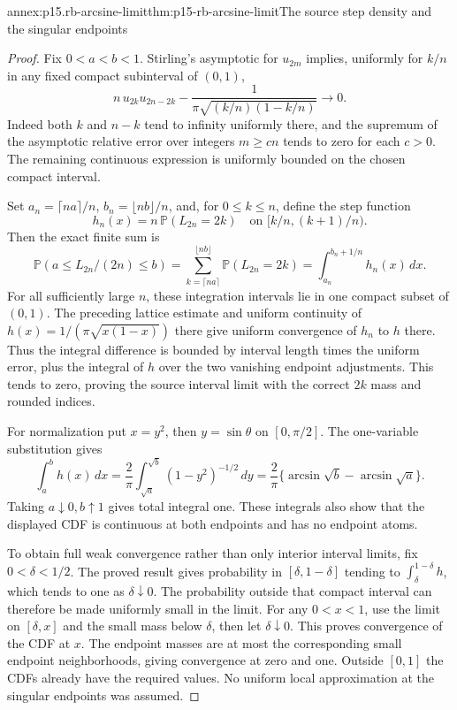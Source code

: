 \begin{annexitem}{annex:p15.rb-arcsine-limit}{thm:p15-rb-arcsine-limit}{The source step density and the singular endpoints}
\begin{proof}
Fix \(0<a<b<1\). Stirling's asymptotic for \(u_{2m}\)
implies, uniformly for \(k/n\) in any fixed compact
subinterval of \((0,1)\),
\[
 n\,u_{2k}u_{2n-2k}
   -\frac1{\pi\sqrt{(k/n)(1-k/n)}}\longrightarrow0.
 \]
Indeed both \(k\) and \(n-k\) tend to infinity uniformly
there, and the supremum of the asymptotic relative error
over integers \(m\geq c n\) tends to zero for each \(c>0\).
The remaining continuous expression is uniformly bounded
on the chosen compact interval.

Set \(a_n=\lceil na\rceil/n\), \(b_n=\lfloor nb\rfloor/n\),
and, for \(0\leq k\leq n\), define the step function
\[
 h_n(x)=n\,\mathbb P(L_{2n}=2k)
                       \quad\text{on }[k/n,(k+1)/n).
 \]
Then the exact finite sum is
\[
 \mathbb P(a\leq L_{2n}/(2n)\leq b)
 =\sum_{k=\lceil na\rceil}^{\lfloor nb\rfloor}
              \mathbb P(L_{2n}=2k)
 =\int_{a_n}^{b_n+1/n}h_n(x)\,dx.
 \]
For all sufficiently large \(n\), these integration intervals
lie in one compact subset of \((0,1)\).
The preceding lattice estimate and uniform continuity of
\(h(x)=1/(\pi\sqrt{x(1-x)})\) there give uniform convergence
of \(h_n\) to \(h\) there.
Thus the integral difference is bounded by interval length
times the uniform error, plus the integral of \(h\) over the
two vanishing endpoint adjustments. This tends to zero,
proving the source interval limit with the correct \(2k\)
mass and rounded indices.

For normalization put \(x=y^2\), then \(y=\sin\theta\)
on \([0,\pi/2]\). The one-variable substitution gives
\[
 \int_a^b h(x)\,dx
 =\frac2\pi\int_{\sqrt a}^{\sqrt b}(1-y^2)^{-1/2}\,dy
 =\frac2\pi\{\arcsin\sqrt b-\arcsin\sqrt a\}.
 \]
Taking \(a\downarrow0,b\uparrow1\) gives total integral one.
These integrals also show that the displayed CDF is continuous
at both endpoints and has no endpoint atoms.

To obtain full weak convergence rather than only interior
interval limits, fix \(0<\delta<1/2\). The proved result gives
probability in \([\delta,1-\delta]\) tending to
\(\int_\delta^{1-\delta}h\), which tends to one as
\(\delta\downarrow0\). The probability outside that compact
interval can therefore be made uniformly small in the limit.
For any \(0<x<1\), use the limit on \([\delta,x]\)
and the small mass below \(\delta\), then let
\(\delta\downarrow0\). This proves convergence of the CDF
at \(x\). The endpoint masses are at most the corresponding
small endpoint neighborhoods, giving convergence at zero and one.
Outside \([0,1]\) the CDFs already have the required values.
No uniform local approximation at the singular endpoints was assumed.
\end{proof}
\end{annexitem}

